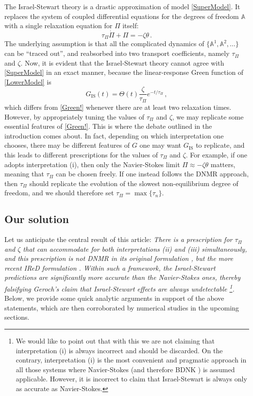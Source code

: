 \documentclass[a4paper, amsfonts, amssymb, amsmath, reprint, showkeys, nofootinbib, twoside, onecolumn,notitlepage]{revtex4-2}
\begin{document}
The Israel-Stewart theory is a drastic approximation of model \eqref{SuperModel}. It replaces the system of coupled differential equations for the degrees of freedom $\mathbb{A}$ with a single relaxation equation for $\Pi$ itself:
\begin{equation}\label{LowerModel}
    \tau_\Pi \dot{\Pi} + \Pi = -\zeta \theta \, .
\end{equation}
The underlying assumption is that all the complicated dynamics of $\{\mathbb{A}^1,\mathbb{A}^2,\ldots\}$ can be ``traced out'', and reabsorbed into two transport coefficients, namely $\tau_\Pi$ and $\zeta$. Now, it is evident that the Israel-Stewart theory cannot agree with \eqref{SuperModel} in an exact manner, because the linear-response Green function of \eqref{LowerModel} is
\begin{equation}\label{Ghisa}
   G_{\mathrm{IS}}(t)= \Theta(t) \dfrac{\zeta}{\tau_\Pi} e^{-t/\tau_{\Pi}} \, , 
\end{equation}
which differs from \eqref{Green!} whenever there are at least two relaxation times. However, by appropriately tuning the values of $\tau_\Pi$ and $\zeta$, we may replicate some essential features of \eqref{Green!}. This is where the debate outlined in the introduction comes about. In fact, depending on which interpretation one chooses, there may be different features of $G$ one may want $G_{\mathrm{IS}}$ to replicate, and this leads to different prescriptions for the values of $\tau_\Pi$ and $\zeta$. For example, if one adopts interpretation (i), then only the Navier-Stokes limit $\Pi \approx -\zeta \theta$ matters, meaning that $\tau_\Pi$ can be chosen freely. If one instead follows the DNMR approach, then $\tau_\Pi$ should replicate the evolution of the slowest non-equilibrium degree of freedom, and we should therefore set $\tau_\Pi = \max \{ \tau_n \}$.

\subsection{Our solution}

Let us anticipate the central result of this article: \textit{There is a prescription for $\tau_\Pi$ and $\zeta$ that can accommodate for both interpretations (ii) and (iii) simultaneously, and this prescription is not DNMR in its original formulation \cite{Denicol2012Boltzmann}, but the more recent IReD formulation \cite{WagnerIReD2022}. Within such a framework, the Israel-Stewart predictions are significantly more accurate than the Navier-Stokes ones, thereby falsifying Geroch's claim that Israel-Stewart effects are always undetectable \cite{Geroch2001}\footnote{We would like to point out that with this we are not claiming that interpretation (i) is always incorrect and should be discarded. On the contrary, interpretation (i) is the most convenient and pragmatic approach in all those systems where Navier-Stokes (and therefore BDNK \cite{Bemfica2017TheFirst,Kovtun2019,BemficaDNDefinitivo2020}) is assumed applicable. However, it is incorrect to claim that Israel-Stewart is always only as accurate as Navier-Stokes.}.} Below, we provide some quick analytic arguments in support of the above statements, which are then corroborated by numerical studies in the upcoming sections.
\end{document}
